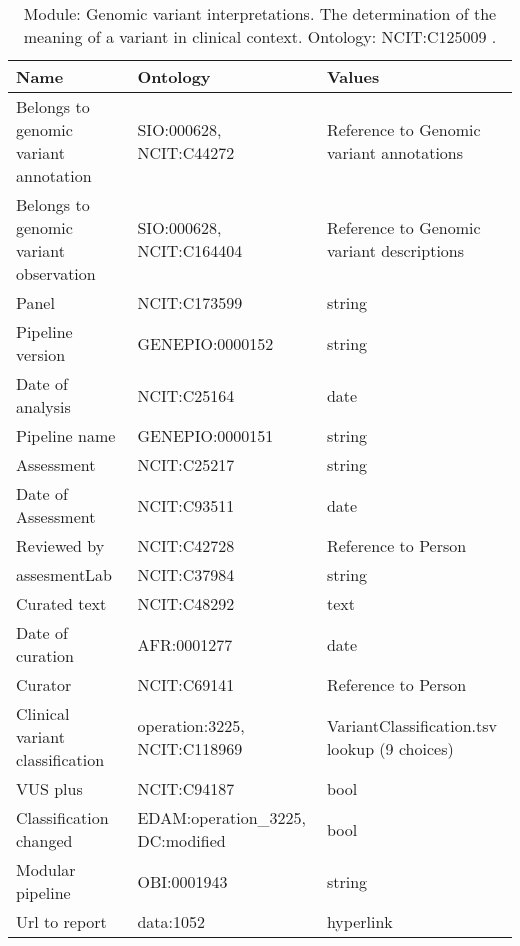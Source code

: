 \documentclass{article}
\begin{document}
\begin{table}[htb]
\begin{tabular}{lll}
Name & Ontology & Values \\
\hline
Belongs to genomic variant annotation & SIO:000628, NCIT:C44272  & Reference to Genomic variant annotations \\
Belongs to genomic variant observation & SIO:000628, NCIT:C164404  & Reference to Genomic variant descriptions \\
Panel & NCIT:C173599  & string \\
Pipeline version & GENEPIO:0000152  & string \\
Date of analysis & NCIT:C25164  & date \\
Pipeline name & GENEPIO:0000151  & string \\
Assessment & NCIT:C25217  & string \\
Date of Assessment & NCIT:C93511  & date \\
Reviewed by & NCIT:C42728  & Reference to Person \\
assesmentLab & NCIT:C37984  & string \\
Curated text & NCIT:C48292  & text \\
Date of curation & AFR:0001277  & date \\
Curator & NCIT:C69141  & Reference to Person \\
Clinical variant classification & operation:3225, NCIT:C118969  & VariantClassification.tsv lookup (9 choices) \\
VUS plus & NCIT:C94187  & bool \\
Classification changed & EDAM:operation\_3225, DC:modified  & bool \\
Modular pipeline & OBI:0001943  & string \\
Url to report & data:1052  & hyperlink \\
\hline
\end{tabular}
\caption[Module: Genomic variant interpretations]{\label{table:table23} Module: Genomic variant interpretations. The determination of the meaning of a variant in clinical context. Ontology: NCIT:C125009 . }
\end{table}
\end{document}
